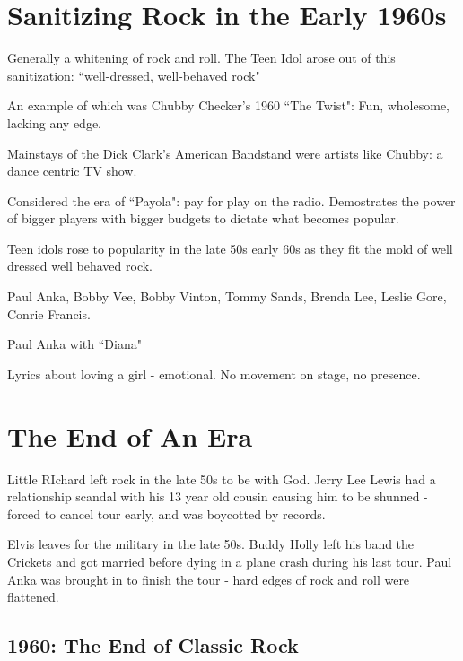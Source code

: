 \documentclass[12pt, a4paper, twoside, openright, titlepage]{book}
\begin{document}
\section{Sanitizing Rock in the Early 1960s}

Generally a whitening of rock and roll. The Teen Idol arose out of this sanitization: ``well-dressed, well-behaved rock"

An example of which was Chubby Checker's 1960 ``The Twist": Fun, wholesome, lacking any edge.

Mainstays of the Dick Clark's American Bandstand were artists like Chubby: a dance centric TV show.


Considered the era of ``Payola": pay for play on the radio. Demostrates the power of bigger players with bigger budgets to dictate what becomes popular.

Teen idols rose to popularity in the late 50s early 60s as they fit the mold of well dressed well behaved rock.

\begin{eg}{}{}
    Paul Anka, Bobby Vee, Bobby Vinton, Tommy Sands, Brenda Lee, Leslie Gore, Conrie Francis.
\end{eg}

\begin{eg}{}{}
    Paul Anka with ``Diana"

    Lyrics about loving a girl - emotional. No movement on stage, no presence.
\end{eg}

\section{The End of An Era}

Little RIchard left rock in the late 50s to be with God. Jerry Lee Lewis had a relationship scandal with his 13 year old cousin causing him to be shunned - forced to cancel tour early, and was boycotted by records.

Elvis leaves for the military in the late 50s. Buddy Holly left his band the Crickets and got married before dying in a plane crash during his last tour. Paul Anka was brought in to finish the tour - hard edges of rock and roll were flattened.

\subsection{1960: The End of Classic Rock}
\end{document}
